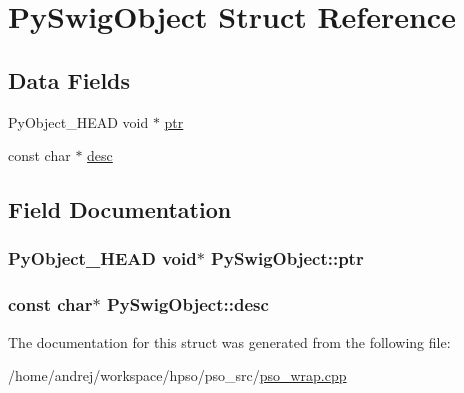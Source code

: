 \hypertarget{structPySwigObject}{
\section{PySwigObject Struct Reference}
\label{structPySwigObject}
}
\subsection*{Data Fields}
\begin{CompactItemize}
\item 
PyObject\_\-HEAD void $\ast$ \hyperlink{structPySwigObject_fe13ea9a5bcde16e0862a5f84c6d1bda}{ptr}
\item 
const char $\ast$ \hyperlink{structPySwigObject_bb863d4a32f9df261f90a759947582fa}{desc}
\end{CompactItemize}


\subsection{Field Documentation}
\hypertarget{structPySwigObject_fe13ea9a5bcde16e0862a5f84c6d1bda}{
\subsubsection{\setlength{\rightskip}{0pt plus 5cm}PyObject\_\-HEAD void$\ast$ {\bf PySwigObject::ptr}}}
\label{structPySwigObject_fe13ea9a5bcde16e0862a5f84c6d1bda}


\hypertarget{structPySwigObject_bb863d4a32f9df261f90a759947582fa}{
\subsubsection{\setlength{\rightskip}{0pt plus 5cm}const char$\ast$ {\bf PySwigObject::desc}}}
\label{structPySwigObject_bb863d4a32f9df261f90a759947582fa}




The documentation for this struct was generated from the following file:\begin{CompactItemize}
\item 
/home/andrej/workspace/hpso/pso\_\-src/\hyperlink{pso__wrap_8cpp}{pso\_\-wrap.cpp}\end{CompactItemize}
